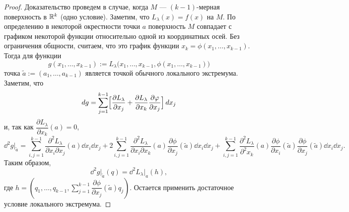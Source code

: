 \documentclass[a4paper]{article}
\theoremstyle{named}
\begin{document}
    \begin{proof}
        Доказательство проведем в случае, когда $M$ --- $(k-1)$-мерная поверхность в $\mathbb{R}^k$ (одно условие). Заметим, что $L_\lambda(x) = f(x)$ на $M$.
        По определению в некоторой окрестности точки $a$ поверхность $M$ совпадает с графиком некоторой функции относительно одной из координатных осей.
        Без ограничения общности, считаем, что это график функции $x_k = \phi(x_1,\ldots, x_{k-1})$.
        Тогда для функции
        $$
            g(x_1,\ldots, x_{k-1}) := L_\lambda\bigl(x_1,\ldots, x_{k-1}, \phi(x_1,\ldots, x_{k-1})\bigr)
        $$
        точка $\tilde{a}:=(a_1,\ldots, a_{k-1})$ является точкой обычного локального экстремума.
        Заметим, что
        $$
            \mathop{}\!d g = \sum_{j=1}^{k-1}\Bigl[\dfrac{\partial L_\lambda}{\partial x_j}+\dfrac{\partial L_\lambda}{\partial x_k}\dfrac{\partial\varphi}{\partial x_j}\Bigr]\mathop{}\!d x_j
        $$
        и, так как $\dfrac{\partial L_\lambda}{\partial x_k}(a)=0$,
        $$
            \dd^2g\bigl|_{\tilde{a}}
            = \sum_{i,j=1}^{k-1}\dfrac{\partial^2 L_\lambda}{\partial x_i\partial x_j}(a)\dd x_i \dd x_j
            +2\sum_{i,j=1}^{k-1}\dfrac{\partial^2 L_\lambda}{\partial x_i\partial x_k}(a)
            \dfrac{\partial\phi}{\partial x_j}(\tilde{a})\dd x_i \dd x_j
            +\sum_{i,j=1}^{k-1}\dfrac{\partial^2 L_\lambda}{\partial^2 x_k}(a)
            \dfrac{\partial\phi}{\partial x_i}(\tilde{a})\dfrac{\partial \phi}{\partial x_j}(\tilde{a})\dd x_i \dd x_j.
        $$
        Таким образом,
        $$
            \dd^2 g \bigl|_{\tilde{a}}(q)	= \dd^2L_\lambda\bigl|_a(h),
        $$
        где $h = \left(q_1,\ldots, q_{k-1}, \sum\limits_{j=1}^{k-1}\dfrac{\partial \phi}{\partial x_j}(\tilde{a})q_j\right)$. Остается применить
        достаточное условие локального экстремума.
    \end{proof}
\end{document}
